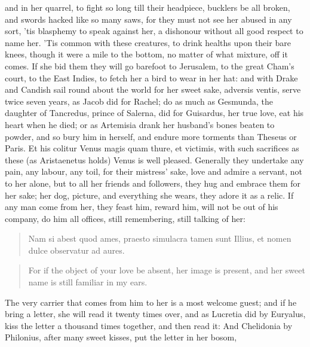and in her quarrel, to fight so long till their headpiece,
bucklers be all broken, and swords hacked like so many saws, for they
must not see her abused in any sort, 'tis blasphemy to speak against
her, a dishonour without all good respect to name her. 'Tis common with
these creatures, to drink healths upon their bare knees, though
it were a mile to the bottom, no matter of what mixture, off it comes.
If she bid them they will go barefoot to Jerusalem, to the great Cham's
court,  to the East Indies, to fetch her a bird to wear in her
hat: and with Drake and Candish sail round about the world for her
sweet sake, adversis ventis, serve twice seven years, as Jacob did for
Rachel; do as much as Gesmunda, the daughter of Tancredus, prince
of Salerna, did for Guisardus, her true love, eat his heart when he
died; or as Artemisia drank her husband's bones beaten to powder, and
so bury him in herself, and endure more torments than Theseus or Paris.
Et his colitur Venus magis quam thure, et victimis, with such
sacrifices as these (as  Aristaenetus holds) Venus is well
pleased. Generally they undertake any pain, any labour, any toil, for
their mistress' sake, love and admire a servant, not to her alone, but
to all her friends and followers, they hug and embrace them for her
sake; her dog, picture, and everything she wears, they adore it as a
relic. If any man come from her, they feast him, reward him, will not
be out of his company, do him all offices, still remembering, still
talking of her:

\begin{latin}
\begin{verse}
Nam si abest quod ames, praesto simulacra tamen sunt
Illius, et nomen dulce observatur ad aures.
\end{verse}
\end{latin}
\translationrule%
\begin{verse}%
For if the object of your love be absent, her image is present,
and her sweet name is still familiar in my ears.
\end{verse}%

The very carrier that comes from him to her is a most welcome guest;
and if he bring a letter, she will read it twenty times over, and as
 Lucretia did by Euryalus, kiss the letter a thousand times
together, and then read it: And Chelidonia by Philonius, after
many sweet kisses, put the letter in her bosom,

